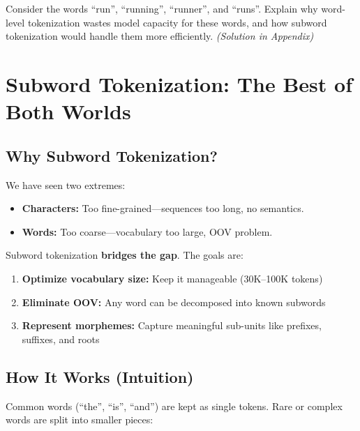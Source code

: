 \documentclass[11pt,a4paper]{article}
\begin{document}
\begin{tcolorbox}[questionbox={Self-Check Q4}]
Consider the words ``run'', ``running'', ``runner'', and ``runs''. Explain why word-level tokenization wastes model capacity for these words, and how subword tokenization would handle them more efficiently. \textit{(Solution in Appendix)}
\end{tcolorbox}

\section{Subword Tokenization: The Best of Both Worlds}

\subsection{Why Subword Tokenization?}

We have seen two extremes:
\begin{itemize}[leftmargin=1.5em]
    \item \textbf{Characters:} Too fine-grained---sequences too long, no semantics.
    \item \textbf{Words:} Too coarse---vocabulary too large, OOV problem.
\end{itemize}

Subword tokenization \textbf{bridges the gap}. The goals are:

\begin{enumerate}[leftmargin=1.5em]
    \item \textbf{Optimize vocabulary size:} Keep it manageable (30K--100K tokens)
    \item \textbf{Eliminate OOV:} Any word can be decomposed into known subwords
    \item \textbf{Represent morphemes:} Capture meaningful sub-units like prefixes, suffixes, and roots
\end{enumerate}

\subsection{How It Works (Intuition)}

Common words (``the'', ``is'', ``and'') are kept as single tokens. Rare or complex words are split into smaller pieces:
\end{document}

